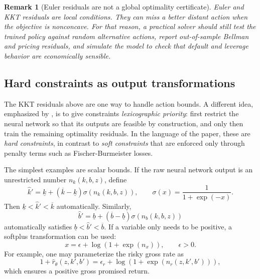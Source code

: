 \documentclass[11pt]{article}
\newtheorem{remark}{Remark}
\newcommand{\1}{\mathbf{1}}
\begin{document}
\begin{remark}[Euler residuals are not a global optimality certificate]
\label{rem:euler-not-global}
Euler and KKT residuals are local conditions. They can miss a better distant
action when the objective is nonconcave. For that reason, a practical solver
should still test the trained policy against random alternative actions, report
out-of-sample Bellman and pricing residuals, and simulate the model to check
that default and leverage behavior are economically sensible.
\end{remark}

\subsection{Hard constraints as output transformations}
\label{subsec:hard-constraints}

The KKT residuals above are one way to handle action bounds. A different idea,
emphasized by \citet{hallhoffarth2023hard}, is to give constraints
\emph{lexicographic priority}: first restrict the neural network so that its
outputs are feasible by construction, and only then train the remaining
optimality residuals. In the language of the paper, these are
\emph{hard constraints}, in contrast to \emph{soft constraints} that are enforced
only through penalty terms such as Fischer-Burmeister losses.

The simplest examples are scalar bounds. If the raw neural network output is an
unrestricted number \(n_k(k,b,z)\), define
\begin{equation}
  \widehat k'
  =
  \underline k+(\overline k-\underline k)
  \sigma(n_k(k,b,z)),
  \qquad
  \sigma(x)=\frac{1}{1+\exp(-x)}.
  \label{eq:hard-k-bound}
\end{equation}
Then \(\underline k<\widehat k'<\overline k\) automatically. Similarly,
\begin{equation}
  \widehat b'
  =
  \underline b+(\overline b-\underline b)
  \sigma(n_b(k,b,z))
  \label{eq:hard-b-bound}
\end{equation}
automatically satisfies \(\underline b<\widehat b'<\overline b\). If a variable
only needs to be positive, a softplus transformation can be used:
\begin{equation}
  x=\epsilon+\log(1+\exp(n_x)),
  \qquad \epsilon>0.
  \label{eq:softplus-positive}
\end{equation}
For example, one may parameterize the risky gross rate as
\[
  1+\widehat r_\theta(z,k',b')
  =
  \epsilon_r+\log(1+\exp(n_r(z,k',b'))),
\]
which ensures a positive gross promised return.
\end{document}
